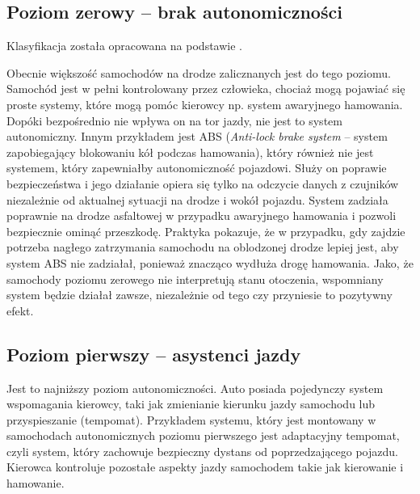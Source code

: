 \subsection{Poziom zerowy -- brak autonomiczności}
Klasyfikacja została opracowana na podstawie \cite{S3}.

Obecnie większość samochodów na drodze zalicznanych jest do tego poziomu. %
Samochód jest w pełni kontrolowany przez człowieka, chociaż mogą pojawiać się proste systemy, które mogą pomóc kierowcy np. system awaryjnego hamowania. 
Dopóki bezpośrednio nie wpływa on na tor jazdy, nie jest to system autonomiczny. 
Innym przykładem jest ABS (\textit{Anti-lock brake system} -- system zapobiegający blokowaniu kół podczas hamowania), który również nie jest systemem, który zapewniałby autonomiczność pojazdowi. %
Służy on poprawie bezpieczeństwa i jego działanie opiera się tylko na odczycie danych z czujników niezależnie od aktualnej sytuacji na drodze i wokół pojazdu. System zadziała poprawnie na drodze asfaltowej w przypadku awaryjnego hamowania i pozwoli bezpiecznie ominąć przeszkodę. Praktyka pokazuje, że w przypadku, gdy zajdzie potrzeba nagłego zatrzymania samochodu na oblodzonej drodze lepiej jest, aby system ABS nie zadziałał, ponieważ znacząco wydłuża drogę hamowania. Jako, że samochody poziomu zerowego nie interpretują stanu otoczenia, wspomniany system będzie działał zawsze, niezależnie od tego czy przyniesie to pozytywny efekt. %


\subsection{Poziom pierwszy -- asystenci jazdy}

Jest to najniższy poziom autonomiczności. 
Auto posiada pojedynczy system wspomagania kierowcy, taki jak zmienianie kierunku jazdy samochodu lub przyspieszanie (tempomat). 
Przykładem systemu, który jest montowany w samochodach autonomicznych poziomu pierwszego jest adaptacyjny tempomat, czyli system, który zachowuje bezpieczny dystans od poprzedzającego pojazdu. Kierowca kontroluje pozostałe aspekty jazdy samochodem takie jak kierowanie i hamowanie. %

